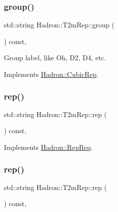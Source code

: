 \subsubsection{\texorpdfstring{group()}{group()}\hspace{0.1cm}{\footnotesize\ttfamily [3/3]}}
{\footnotesize\ttfamily std\+::string Hadron\+::\+T2m\+Rep\+::group (\begin{DoxyParamCaption}{ }\end{DoxyParamCaption}) const\hspace{0.3cm}{\ttfamily [inline]}, {\ttfamily [virtual]}}

Group label, like Oh, D2, D4, etc. 

Implements \mbox{\hyperlink{structHadron_1_1CubicRep_a0748f11ec87f387062c8e8981339a29c}{Hadron\+::\+Cubic\+Rep}}.

\mbox{\label{structHadron_1_1T2mRep_a7b3ba7f0e39ae3d4f8f377ab928fafee}} 
\subsubsection{\texorpdfstring{rep()}{rep()}\hspace{0.1cm}{\footnotesize\ttfamily [1/5]}}
{\footnotesize\ttfamily std\+::string Hadron\+::\+T2m\+Rep\+::rep (\begin{DoxyParamCaption}{ }\end{DoxyParamCaption}) const\hspace{0.3cm}{\ttfamily [inline]}, {\ttfamily [virtual]}}



Implements \mbox{\hyperlink{structHadron_1_1RepRep_ab3213025f6de249f7095892109575fde}{Hadron\+::\+Rep\+Rep}}.

\mbox{\label{structHadron_1_1T2mRep_a7b3ba7f0e39ae3d4f8f377ab928fafee}} 
\subsubsection{\texorpdfstring{rep()}{rep()}\hspace{0.1cm}{\footnotesize\ttfamily [2/5]}}
{\footnotesize\ttfamily std\+::string Hadron\+::\+T2m\+Rep\+::rep (\begin{DoxyParamCaption}{ }\end{DoxyParamCaption}) const\hspace{0.3cm}{\ttfamily [inline]}, {\ttfamily [virtual]}}



